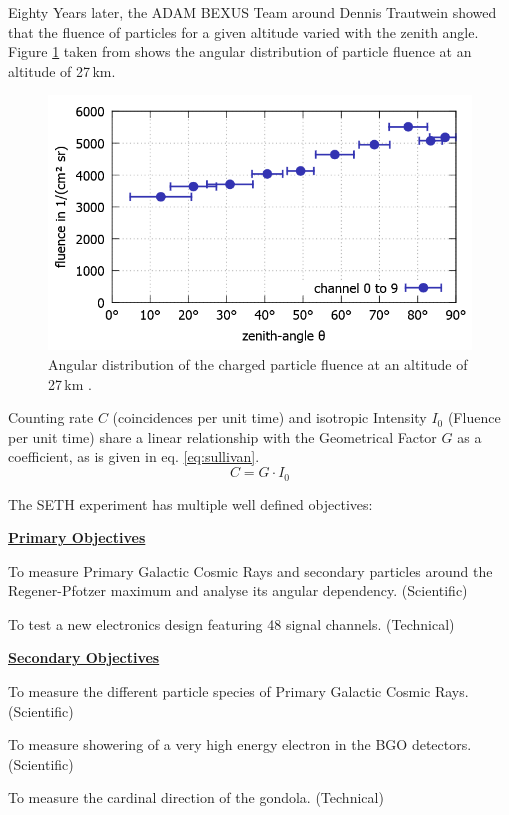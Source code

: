 Eighty Years later, the \ac{ADAM} \ac{BEXUS} Team around Dennis Trautwein showed that the fluence of particles for a given altitude varied with the zenith angle. Figure \ref{fig:martensen2015} taken from \parencite{martensen2015} shows the angular distribution of particle fluence at an altitude of 27\,km.

\begin{figure}[H]
    \centering
    \includegraphics[width=0.6\linewidth]{images/01_background/martensen.png}
    \caption[Results of \acs{ADAM} at 27\,km]{Angular distribution of the charged particle fluence at an altitude of 27\,km \parencite{martensen2015}.}
    \label{fig:martensen2015}
\end{figure}

Counting rate $C$ (coincidences per unit time) and isotropic Intensity $I_0$ (Fluence per unit time) share a linear relationship with the Geometrical Factor $G$ as a coefficient, as is given in eq. \eqref{eq:sullivan}\parencite{SULLIVAN19715}.
\begin{equation}
    C=G\cdot I_0
    \label{eq:sullivan}
\end{equation}

\newpage
The \ac{SETH} experiment has multiple well defined objectives:

    \underline{\textbf{Primary Objectives}}
		\begin{description}\setlength\itemsep{-1em}
			\item[Obj. 1.1:] To measure Primary Galactic Cosmic Rays and secondary particles around the Regener-Pfotzer maximum and analyse its angular dependency. (Scientific)
			\item[Obj. 1.2:] To test a new electronics design featuring 48 signal channels. (Technical)
		\end{description}
	\underline{\textbf{Secondary Objectives}}
		\begin{description}\setlength\itemsep{-1em}
			\item[Obj. 2.1:] To measure the different particle species of Primary Galactic Cosmic Rays. (Scientific)
            \item[Obj. 2.2:] To measure showering of a very high energy electron in the \ac{BGO} detectors. (Scientific)
            \item[Obj. 2.3:] To measure the cardinal direction of the gondola. (Technical)
		\end{description}

